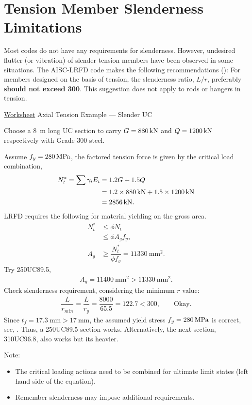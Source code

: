 \section{Tension Member Slenderness Limitations}
Most codes do not have any requirements for slenderness. However, undesired flutter (or vibration) of slender tension members have been observed in some situations. The AISC-LRFD code makes the following recommendations (): For members designed on the basis of tension, the slenderness ratio, $L/r$, preferably \textbf{should not exceed 300}. This suggestion does not apply to rods or hangers in tension.
\begin{exmp}\href{run:./WORKSHEET/CH03/EX3.ATUC.sm}{Worksheet}
Axial Tension Example --- Slender UC

Choose a \SI{8}{\meter} long UC section to carry $G=\SI{880}{\kilo\newton}$ and $Q=\SI{1200}{\kilo\newton}$ respectively with Grade 300 steel.
\end{exmp}
\begin{solution}
Assume $f_y=\SI{280}{\mega\pascal}$, the factored tension force is given by the critical load combination,
\begin{align*}
N^*_t=\sum\gamma_iE_i&=1.2G+1.5Q\\
&=1.2\times\SI{880}{\kilo\newton}+1.5\times\SI{1200}{\kilo\newton}\\
&=\SI{2856}{\kilo\newton}.
\end{align*}
LRFD requires the following for material yielding on the gross area.
\begin{align*}
N^*_t&\leqslant\phi{}N_t\\
&\leqslant\phi{}A_gf_y,\\
A_g&\geqslant\dfrac{N^*_t}{\phi{}f_y}=\SI{11330}{\mm^2}.
\end{align*}
Try 250UC89.5,
\begin{gather*}
A_g=\SI{11400}{\mm^2}>\SI{11330}{\mm^2}.
\end{gather*}
Check slenderness requirement, considering the minimum $r$ value:
\begin{gather*}
\dfrac{L}{r_{min}}=\dfrac{L}{r_y}=\dfrac{8000}{65.5}=\num{122.7}<\num{300},\qquad\text{Okay.}
\end{gather*}
Since $t_f=\SI{17.3}{\mm}>\SI{17}{\mm}$, the assumed yield stress $f_y=\SI{280}{\mega\pascal}$ is correct, see, . Thus, a 250UC89.5 section works. Alternatively, the next section, 310UC96.8, also works but its heavier.

Note:
\begin{itemize}
\item The critical loading actions need to be combined for ultimate limit states (left hand side of the equation).
\item Remember slenderness may impose additional requirements.
\end{itemize}
\end{solution}

